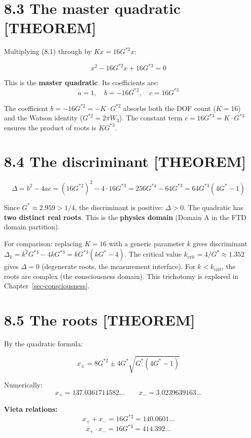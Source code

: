 \documentclass[
  11pt,
  letterpaper,
  twoside,
  openright]{book}
\begin{document}
\section{8.3 The master quadratic
{[}THEOREM{]}}\label{the-master-quadratic-theorem}

Multiplying (8.1) through by \(Kx = 16G^{*2}x\):

\[
x^2 - 16G^{*2} x + 16G^{*3} = 0
\tag{8.2}
\]

This is the \textbf{master quadratic}. Its coefficients are: \[
a = 1, \quad b = -16G^{*2}, \quad c = 16G^{*3}
\]

The coefficient \(b = -16G^{*2} = -K \cdot G^{*2}\) absorbs both the DOF
count (\(K = 16\)) and the Watson identity (\(G^{*2} = 2\pi W_3\)). The
constant term \(c = 16G^{*3} = K \cdot G^{*3}\) ensures the product of
roots is \(K G^{*3}\).

\section{8.4 The discriminant
{[}THEOREM{]}}\label{the-discriminant-theorem}

\[
\Delta = b^2 - 4ac = (16G^{*2})^2 - 4 \cdot 16G^{*3} = 256G^{*4} - 64G^{*3} = 64G^{*3}(4G^* - 1)
\tag{8.3}
\]

Since \(G^* \approx 2.959 > 1/4\), the discriminant is positive:
\(\Delta > 0\). The quadratic has \textbf{two distinct real roots}. This
is the \textbf{physics domain} (Domain A in the FTD domain partition).

For comparison: replacing \(K = 16\) with a generic parameter \(k\)
gives discriminant
\(\Delta_k = k^2 G^{*4} - 4kG^{*3} = kG^{*3}(kG^* - 4)\). The critical
value \(k_{\text{crit}} = 4/G^* \approx 1.352\) gives \(\Delta = 0\)
(degenerate roots, the measurement interface). For
\(k < k_{\text{crit}}\), the roots are complex (the consciousness
domain). This trichotomy is explored in Chapter~\ref{sec-consciousness}.

\section{8.5 The roots {[}THEOREM{]}}\label{the-roots-theorem}

By the quadratic formula:

\[
x_\pm = 8G^{*2} \pm 4G^* \sqrt{G^*(4G^* - 1)}
\tag{8.4}
\]

Numerically: \[
x_+ = 137.0361714582\ldots \qquad x_- = 3.0239639163\ldots
\]

\textbf{Vieta relations:} \[
x_+ + x_- = 16G^{*2} = 140.0601\ldots
\tag{8.5}
\] \[
x_+ \cdot x_- = 16G^{*3} = 414.392\ldots
\tag{8.6}
\]
\end{document}
